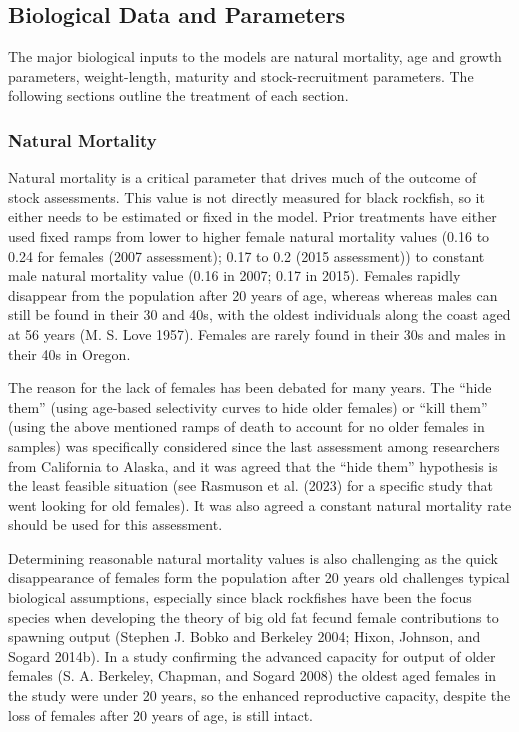 \documentclass[11pt,
  english,
  letterpaper,
]{article}
\begin{document}
\hypertarget{biological-data-and-parameters}{%
\subsection{Biological Data and Parameters}\label{biological-data-and-parameters}}

The major biological inputs to the models are natural mortality, age and growth parameters, weight-length, maturity and stock-recruitment parameters. The following sections outline the treatment of each section.

\hypertarget{natural-mortality}{%
\subsubsection{Natural Mortality}\label{natural-mortality}}

Natural mortality is a critical parameter that drives much of the outcome of stock assessments. This value is not directly measured for black rockfish, so it either needs to be estimated or fixed in the model. Prior treatments have either used fixed ramps from lower to higher female natural mortality values (0.16 to 0.24 for females (2007 assessment); 0.17 to 0.2 (2015 assessment)) to constant male natural mortality value (0.16 in 2007; 0.17 in 2015). Females rapidly disappear from the population after 20 years of age, whereas whereas males can still be found in their 30 and 40s, with the oldest individuals along the coast aged at 56 years (M. S. Love 1957). Females are rarely found in their 30s and males in their 40s in Oregon.

The reason for the lack of females has been debated for many years. The ``hide them'' (using age-based selectivity curves to hide older females) or ``kill them'' (using the above mentioned ramps of death to account for no older females in samples) was specifically considered since the last assessment among researchers from California to Alaska, and it was agreed that the ``hide them'' hypothesis is the least feasible situation (see Rasmuson et al. (2023) for a specific study that went looking for old females). It was also agreed a constant natural mortality rate should be used for this assessment.

Determining reasonable natural mortality values is also challenging as the quick disappearance of females form the population after 20 years old challenges typical biological assumptions, especially since black rockfishes have been the focus species when developing the theory of big old fat fecund female contributions to spawning output (Stephen J. Bobko and Berkeley 2004; Hixon, Johnson, and Sogard 2014b). In a study confirming the advanced capacity for output of older females (S. A. Berkeley, Chapman, and Sogard 2008) the oldest aged females in the study were under 20 years, so the enhanced reproductive capacity, despite the loss of females after 20 years of age, is still intact.
\end{document}

